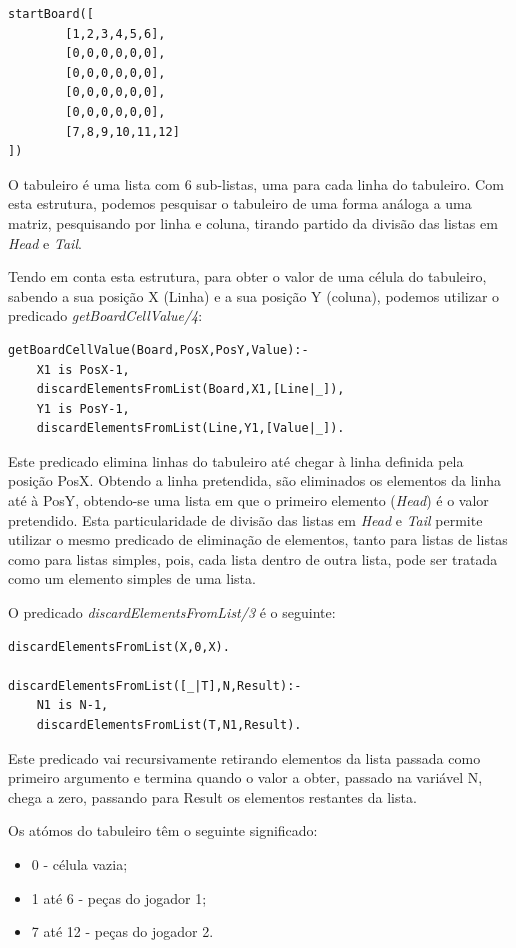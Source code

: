 \documentclass[paper=a4, fontsize=11pt]{scrartcl} %
\numberwithin{equation}{section} %
\numberwithin{figure}{section} %
\numberwithin{table}{section} %
\begin{document}
\begin{lstlisting}
startBoard([
		[1,2,3,4,5,6],
		[0,0,0,0,0,0],
		[0,0,0,0,0,0],
		[0,0,0,0,0,0],
		[0,0,0,0,0,0],
		[7,8,9,10,11,12]
])
\end{lstlisting}

O tabuleiro é uma lista com 6 sub-listas, uma para cada linha do tabuleiro. Com esta estrutura, podemos pesquisar o tabuleiro de uma forma análoga a uma matriz, pesquisando por linha e coluna, tirando partido da divisão das listas em \emph{Head} e \emph{Tail}. 

Tendo em conta esta estrutura, para obter o valor de uma célula do tabuleiro, sabendo a sua posição X (Linha) e a sua posição Y (coluna), podemos utilizar o predicado \textit{getBoardCellValue/4}:

\begin{lstlisting}
getBoardCellValue(Board,PosX,PosY,Value):-
	X1 is PosX-1,
	discardElementsFromList(Board,X1,[Line|_]),
	Y1 is PosY-1,
	discardElementsFromList(Line,Y1,[Value|_]).
\end{lstlisting}

Este predicado elimina linhas do tabuleiro até chegar à linha definida pela posição PosX. Obtendo a linha pretendida, são eliminados os elementos da linha até à PosY, obtendo-se uma lista em que o primeiro elemento (\emph{Head}) é o valor pretendido. Esta particularidade de divisão das listas em \emph{Head} e \emph{Tail} permite utilizar o mesmo predicado de eliminação de elementos, tanto para listas de listas como para listas simples, pois, cada lista dentro de outra lista, pode ser tratada como um elemento simples de uma lista.

O predicado \textit{discardElementsFromList/3} é o seguinte:

\begin{lstlisting}
discardElementsFromList(X,0,X).

discardElementsFromList([_|T],N,Result):-
	N1 is N-1,
	discardElementsFromList(T,N1,Result).
\end{lstlisting}

Este predicado vai recursivamente retirando elementos da lista passada como primeiro argumento e termina quando o valor a obter, passado na variável N, chega a zero, passando para Result os elementos restantes da lista.

Os atómos do tabuleiro têm o seguinte significado:

\begin{itemize}
	\item 0 -  célula vazia;
	\item 1 até 6 - peças do jogador 1;
	\item 7 até 12 - peças do jogador 2.
\end{itemize}
\end{document}
